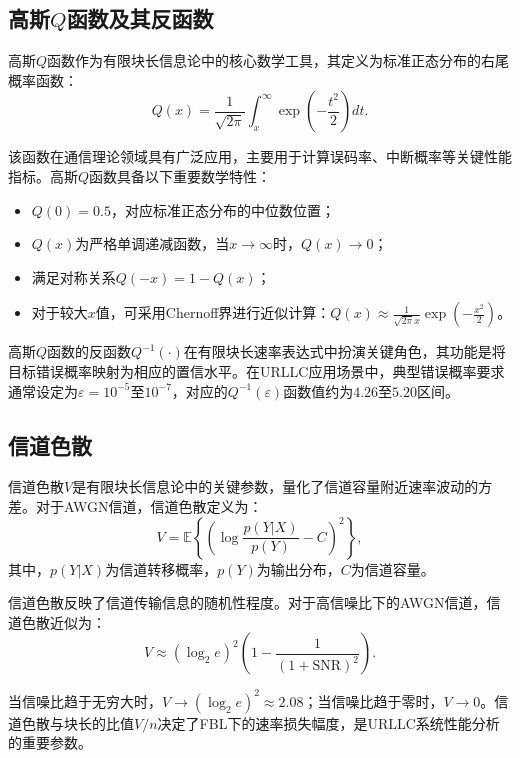 \subsection{高斯$Q$函数及其反函数}

高斯$Q$函数作为有限块长信息论中的核心数学工具，其定义为标准正态分布的右尾概率函数\cite{chaptertwo1}：
\begin{equation}
Q(x) = \frac{1}{\sqrt{2\pi}} \int_{x}^{\infty} \exp\left(-\frac{t^2}{2}\right)dt.
\end{equation}

该函数在通信理论领域具有广泛应用，主要用于计算误码率、中断概率等关键性能指标。高斯$Q$函数具备以下重要数学特性：
\begin{itemize}
\item $Q(0) = 0.5$，对应标准正态分布的中位数位置；
\item $Q(x)$为严格单调递减函数，当$x \to \infty$时，$Q(x) \to 0$；
\item 满足对称关系$Q(-x) = 1 - Q(x)$；
\item 对于较大$x$值，可采用Chernoff界进行近似计算：$Q(x) \approx \frac{1}{\sqrt{2\pi}x}\exp\left(-\frac{x^2}{2}\right)$。
\end{itemize}

高斯$Q$函数的反函数$Q^{-1}(\cdot)$在有限块长速率表达式中扮演关键角色，其功能是将目标错误概率映射为相应的置信水平。在URLLC应用场景中，典型错误概率要求通常设定为$\varepsilon = 10^{-5}$至$10^{-7}$\cite{chaptertwo4}，对应的$Q^{-1}(\varepsilon)$函数值约为$4.26$至$5.20$区间。

\subsection{信道色散}

信道色散$V$是有限块长信息论中的关键参数，量化了信道容量附近速率波动的方差\cite{chaptertwo1}。对于AWGN信道，信道色散定义为：
\begin{equation}
V = \mathbb{E}\left\{\left(\log\frac{p(Y|X)}{p(Y)} - C\right)^2\right\},
\end{equation}
其中，$p(Y|X)$为信道转移概率，$p(Y)$为输出分布，$C$为信道容量。

信道色散反映了信道传输信息的随机性程度。对于高信噪比下的AWGN信道，信道色散近似为：
\begin{equation}
V \approx (\log_2 e)^2 \left(1 - \frac{1}{(1+\text{SNR})^2}\right).
\end{equation}

当信噪比趋于无穷大时，$V \to (\log_2 e)^2 \approx 2.08$；当信噪比趋于零时，$V \to 0$。信道色散与块长的比值$V/n$决定了FBL下的速率损失幅度，是URLLC系统性能分析的重要参数\cite{chaptertwo5}。

